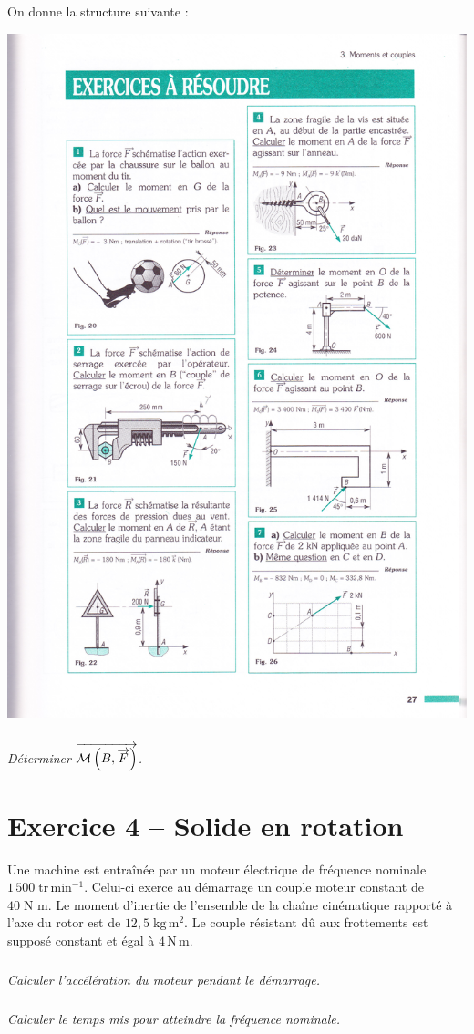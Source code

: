 \documentclass[10pt,fleqn]{article} %
\begin{document}
\begin{multicols}{2}
On donne la structure suivante : 
\begin{center}
\includegraphics[width=.8\linewidth]{images/fig_24}
\end{center}


\subparagraph{}
\textit{Déterminer $\overrightarrow{\mathcal{M}\left(B,\overrightarrow{F} \right)}$.}




\section*{Exercice 4 -- Solide en rotation}
\setcounter{subparagraph}{0}

 Une machine est entraînée par un moteur électrique de fréquence nominale $1\,500\; \text{tr}\,\text{min}^{-1}$. Celui-ci exerce au démarrage un couple moteur constant de $40\; \text{N}\,\,\text{m}$. Le moment d’inertie de l’ensemble de la chaîne cinématique rapporté à l’axe du rotor est de $12,5\; \text{kg}\,\text{m}^2$. Le couple résistant dû aux frottements est supposé constant et égal à $4\, \text{N} \, \text{m}$.

\subparagraph{}
\textit{Calculer l’accélération du moteur pendant le démarrage.}

\subparagraph{}
\textit{Calculer le temps mis pour atteindre la fréquence nominale.}

\end{multicols}
\end{document}
